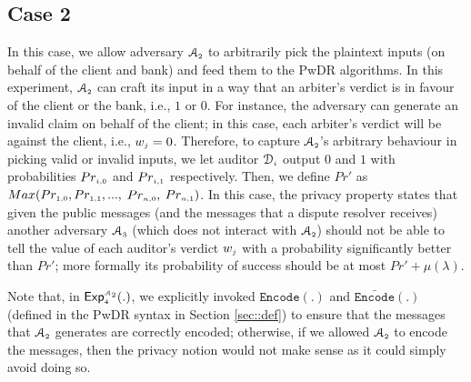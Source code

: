 \subsection{Case 2} 
In this case, we allow adversary $\mathcal{A}_{\scriptscriptstyle 2}$ to arbitrarily pick the plaintext inputs (on behalf of the client and bank) and feed them to the PwDR algorithms. In this experiment, $\mathcal{A}_{\scriptscriptstyle 2}$ can craft its input in a way that an arbiter's verdict is in favour of the client or the bank, i.e., $1$ or $0$. For instance, the adversary can generate an invalid claim on behalf of the client; in this case, each arbiter's verdict will be against the client, i.e., $w_{\scriptscriptstyle j}=0$.  
% 
Therefore, to capture $\mathcal{A}_{\scriptscriptstyle 2}$'s arbitrary behaviour in picking valid or invalid inputs, we let auditor $\mathcal{D}_{\scriptscriptstyle i}$ output $0$ and $1$ with probabilities $Pr_{\scriptscriptstyle i,0}$ and $Pr_{\scriptscriptstyle i,1}$ respectively. Then, we define $Pr'$ as  $Max(Pr_{\scriptscriptstyle 1,0},Pr_{\scriptscriptstyle 1,1}, ...,$ $ Pr_{\scriptscriptstyle n,0}, $ $Pr_{\scriptscriptstyle n,1} )$.  
% 
In this case, the privacy property states that given the public messages (and the messages that a dispute resolver receives) another adversary $\mathcal{A}_{\scriptscriptstyle 3}$ (which does not interact with $\mathcal{A}_{\scriptscriptstyle 2}$) should not be able to tell the value of each auditor's verdict $w_{\scriptscriptstyle j}$ with a probability significantly better than $Pr'$; more formally its probability of success should be at most $Pr'+\mu(\lambda)$.

Note that, in $\mathsf{Exp}_{\scriptscriptstyle 4}^{\scriptscriptstyle\mathcal{A}_{\scriptscriptstyle 2}}(.)$, we explicitly invoked $\mathtt{Encode}(.)$ and ${\bar{ \mathtt{Encode}}}(.)$ (defined in the PwDR syntax in Section \ref{sec::def}) to ensure that the messages that $\mathcal{A}_{\scriptscriptstyle 2}$ generates are correctly encoded; otherwise, if we allowed  $\mathcal{A}_{\scriptscriptstyle 2}$ to encode the messages, then the privacy notion would not make sense as it could simply avoid doing so.




%
